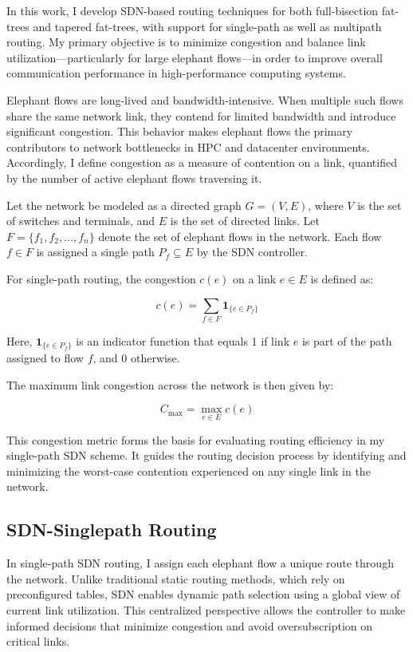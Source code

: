 
In this work, I develop SDN-based routing techniques for both full-bisection fat-trees and tapered fat-trees, with support for single-path as well as multipath routing. My primary objective is to minimize congestion and balance link utilization—particularly for large elephant flows—in order to improve overall communication performance in high-performance computing systems.

Elephant flows are long-lived and bandwidth-intensive. When multiple such flows share the same network link, they contend for limited bandwidth and introduce significant congestion. This behavior makes elephant flows the primary contributors to network bottlenecks in HPC and datacenter environments. Accordingly, I define congestion as a measure of contention on a link, quantified by the number of active elephant flows traversing it.

Let the network be modeled as a directed graph \( G = (V, E) \), where \( V \) is the set of switches and terminals, and \( E \) is the set of directed links. Let \( F = \{f_1, f_2, \dots, f_n\} \) denote the set of elephant flows in the network. Each flow \( f \in F \) is assigned a single path \( P_f \subseteq E \) by the SDN controller.

For single-path routing, the congestion \( c(e) \) on a link \( e \in E \) is defined as:

\[
c(e) = \sum_{f \in F} \mathbf{1}_{\{e \in P_f\}}
\]

Here, \( \mathbf{1}_{\{e \in P_f\}} \) is an indicator function that equals 1 if link \( e \) is part of the path assigned to flow \( f \), and 0 otherwise.

The maximum link congestion across the network is then given by:

\[
C_{\text{max}} = \max_{e \in E} c(e)
\]

This congestion metric forms the basis for evaluating routing efficiency in my single-path SDN scheme. It guides the routing decision process by identifying and minimizing the worst-case contention experienced on any single link in the network.


\subsection{SDN-Singlepath Routing}

In single-path SDN routing, I assign each elephant flow a unique route through the network. Unlike traditional static routing methods, which rely on preconfigured tables, SDN enables dynamic path selection using a global view of current link utilization. This centralized perspective allows the controller to make informed decisions that minimize congestion and avoid oversubscription on critical links.

